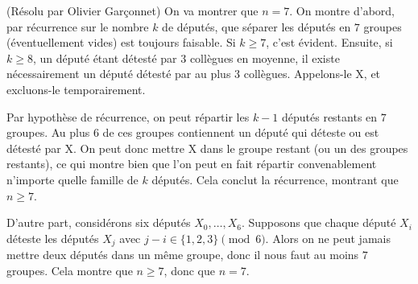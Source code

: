 \begin{sol}[102](Résolu par Olivier Garçonnet)
On va montrer que $n = 7$.
On montre d'abord, par récurrence sur le nombre $k$ de députés,
que séparer les députés en $7$ groupes (éventuellement vides) est toujours faisable.
Si $k \geq 7$, c'est évident. Ensuite, si $k \geq 8$, un député étant détesté
par $3$ collègues en moyenne, il existe nécessairement un député détesté par au plus $3$ collègues.
Appelons-le X, et excluons-le temporairement.

Par hypothèse de récurrence, on peut répartir les $k-1$ députés restants en $7$ groupes.
Au plus $6$ de ces groupes contiennent un député qui déteste ou est détesté par X.
On peut donc mettre X dans le groupe restant (ou un des groupes restants),
ce qui montre bien que l'on peut en fait répartir convenablement n'importe quelle famille de $k$ députés.
Cela conclut la récurrence, montrant que $n \geq 7$.

D'autre part, considérons six députés $X_0,\ldots,X_6$.
Supposons que chaque député $X_i$ déteste les députés $X_j$ avec $j-i \in \{1,2,3\} \pmod{6}$.
Alors on ne peut jamais mettre deux députés dans un même groupe, donc il nous faut au moins $7$ groupes.
Cela montre que $n \geq 7$, donc que $n = 7$.
\end{sol}

